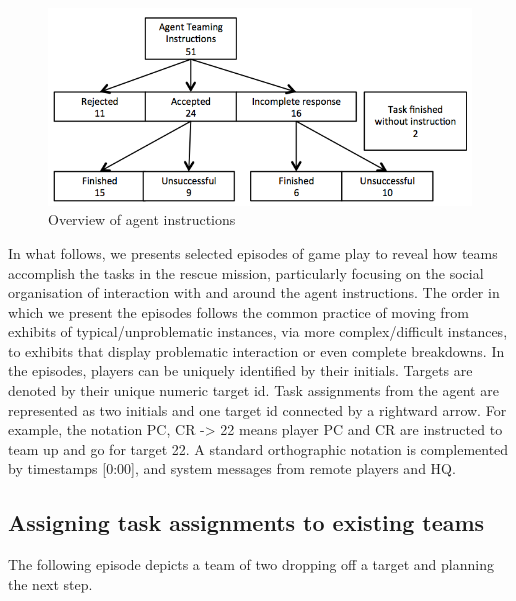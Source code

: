 \begin{figure}[ht]
 \includegraphics[width=1\textwidth]{img/study2/system/agentInstructions}
\caption{Overview of agent instructions}
\label{fig:study2agentInstructions}
\end{figure}

In what follows, we presents selected episodes of game play to reveal how teams accomplish the tasks in the rescue mission, particularly focusing on the social organisation of interaction with and around the agent instructions. The order in which we present the episodes follows the common practice of moving from exhibits of typical/unproblematic instances, via more complex/difficult instances, to exhibits that display problematic interaction or even complete breakdowns. In the episodes, players can be uniquely identified by their initials. Targets are denoted by their unique numeric target id. Task assignments from the agent are represented as two initials and one target id connected by a rightward arrow. For example, the notation PC, CR -> 22 means player PC and CR are instructed to team up and go for target 22. A standard orthographic notation \cite{Jordan1995} is complemented by timestamps [0:00], and system messages from remote players and HQ.  

\subsection{Assigning task assignments to existing teams}
The following episode depicts a team of two dropping off a target and planning the next step.\\

